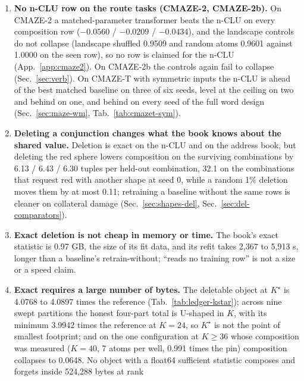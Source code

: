 \documentclass{article} %
\newcommand{\Kstar}{\ensuremath{K^{\star}}}
\begin{document}
\begin{enumerate}[leftmargin=*,itemsep=1pt]
\item \textbf{No n-CLU row on the route tasks (CMAZE-2, CMAZE-2b).} On CMAZE-2 a matched-parameter transformer beats the
  n-CLU on every composition row ($-0.0560$ / $-0.0209$ / $-0.0434$), and the landscape controls do
  not collapse (landscape shuffled 0.9509 and random atoms 0.9601 against
  1.0000 on the seen row), so no row is claimed for the n-CLU (App.~\ref{app:cmaze2}). On
  CMAZE-2b the controls again fail to collapse (Sec.~\ref{sec:verb}). %
  On CMAZE-T with symmetric inputs the n-CLU is ahead of the best matched baseline on three of six seeds,
  level at the ceiling on two and behind on one, and behind on every seed of the full word design %
  (Sec.~\ref{sec:maze-wm}, Tab.~\ref{tab:cmazet-sym}).
\item \textbf{Deleting a conjunction changes what the book knows about the shared value.} Deletion
  is exact on the n-CLU and on the address book, but deleting the red sphere lowers composition on
  the surviving combinations by 6.13 / 6.43 / 6.30 tuples per held-out combination, 32.1 on the combinations that request red %
  with another shape at seed 0, while a random 1\% deletion moves them by at most 0.11; retraining a %
  baseline without the same rows is cleaner on collateral damage (Sec.~\ref{sec:shapes-del},
  Sec.~\ref{sec:del-comparators}).
\item \textbf{Exact deletion is not cheap in memory or time.} The book's exact statistic is 0.97 GB, %
  the size of its fit data, and its refit takes 2,367 to 5,913 s, longer than a baseline's %
  retrain-without; ``reads no training row'' is not a size or a speed claim.
\item \textbf{Exact requires a large number of bytes.} The deletable object at $\Kstar$ is 4.0768 to 4.0897
  times the reference (Tab.~\ref{tab:ledger-kstar}); across nine swept partitions the honest
  four-part total is U-shaped in $K$, with its minimum 3.9942 times the reference at $K=24$, so
  $\Kstar$ is not the point of smallest footprint; and on the one configuration at $K\ge36$ whose composition
  was measured ($K=40$, 7 atoms per well, 0.991 times the pin) composition collapses to 0.0648.
  No object with a float64 sufficient statistic composes and forgets inside 524,288 bytes at rank

\end{enumerate}
\end{document}
